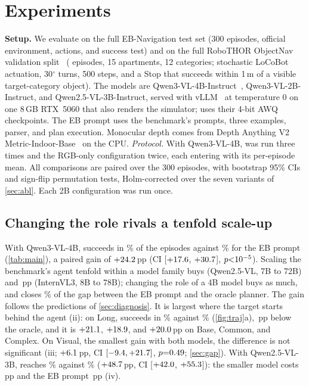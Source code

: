 \section{Experiments}
\label{sec:exp}

\noindent\textbf{Setup.}
We evaluate on the full EB-Navigation test set (300 episodes, official environment, actions, and success test) and
on the full RoboTHOR ObjectNav validation split~\cite{deitke2020robothor} (\nRoboN{} episodes, 15 apartments, 12
categories; stochastic \mbox{LoCoBot} actuation, 30$^\circ$ turns, 500 steps, and a Stop that succeeds within 1\,m of a
visible target-category object). The models are Qwen3-VL-4B-Instruct~\cite{bai2025qwen3vl},
Qwen3-VL-2B-Instruct, and Qwen2.5-VL-3B-Instruct, served with vLLM~\cite{kwon2023vllm} at temperature 0 on one 8\,GB RTX~5060 that also
renders the simulator; \ours uses their 4-bit AWQ checkpoints. The EB prompt uses the benchmark's prompts, three
examples, parser, and plan execution. Monocular depth comes from Depth
Anything V2 Metric-Indoor-Base~\cite{yang2024depthv2} on the CPU.
\textit{Protocol.} With Qwen3-VL-4B, \ours was run three times and the RGB-only configuration twice, each entering with its
per-episode mean. All comparisons are paired over the 300 episodes, with bootstrap 95\% CIs and sign-flip
permutation tests, Holm-corrected over the seven variants of \cref{sec:abl}. Each 2B configuration was run once.

\subsection{Changing the role rivals a tenfold scale-up}
\label{sec:main}



With Qwen3-VL-4B, \ours succeeds in \nSThree\% of the episodes against \nEBThree\% for the EB prompt
(\cref{tab:main}), a paired gain of ${+}24.2$\,pp (CI [${+}17.6$, ${+}30.7$],
$p{<}10^{-5}$). Scaling the benchmark's agent tenfold within a model family buys \nScaleQwen{} (Qwen2.5-VL, 7B to
72B) and \nScaleIntern\,pp (InternVL3, 8B to 78B); changing the role of a 4B model buys as much, and closes
\nGapClosed\% of the gap between the EB prompt and the oracle planner. The gain follows the predictions of
\cref{sec:diagnosis}. It is largest where the target starts
behind the agent (ii): on Long, \ours succeeds in \nSThreeLong\% against \nEBThreeLong\% (\cref{fig:traj}a), \nOracleGapLong\,pp below the
oracle, and it is $+21.1$, $+18.9$, and $+20.0$\,pp on Base, Common, and Complex. On
Visual, the smallest gain with both models, the difference is not significant (iii; $+6.1$\,pp, CI
$[-9.4, +21.7]$, $p{=}0.49$; \cref{sec:gap}). With Qwen2.5-VL-3B, \ours reaches \nSTwo\% against \nEBTwo\% (${+}48.7$\,pp, CI
[${+}42.0$, ${+}55.3$]): the smaller model costs \ours \nScaleDrop\,pp and the EB prompt
\nScaleDropEB\,pp (iv).

